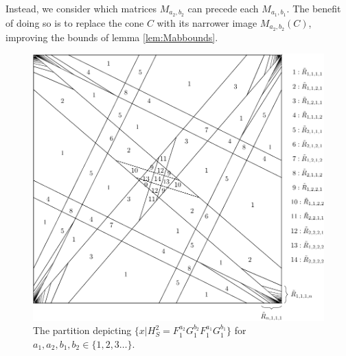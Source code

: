 \documentclass{iopart}
\begin{document}
Instead, we consider which matrices $M_{a_2,b_2}$ can precede each $M_{a_1,b_1}$. The benefit of doing so is to replace the cone $C$ with its narrower image $M_{a_2,b_2} (C)$, improving the bounds of lemma \ref{lem:Mabbounds}. 


\begin{figure}
	\centering
\includegraphics[width=0.75\linewidth]{double_partition_fig.pdf}
\caption{The partition depicting $\{ x | H_S^2 = F_1^{a_2} G_1^{b_2} F_1^{a_1} G_1^{b_1}\}$ for $a_1, a_2, b_1, b_2 \in \{ 1, 2, 3 \ldots \}$.}\label{fig:improved_partition}
\end{figure}
\end{document}
